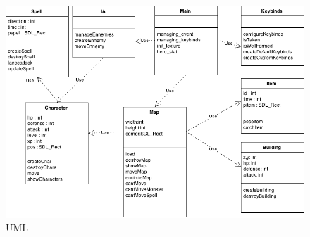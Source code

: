\begin{figure}[!ht]
    \includegraphics[width=1\textwidth]{./images/uml.png}
    \caption{UML}
\end{figure}

